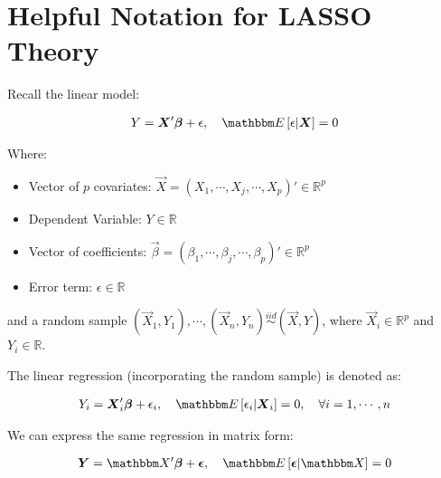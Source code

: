 \section{Helpful Notation for LASSO Theory}
\label{sec:notation-help-lasso}

Recall the linear model:

\begin{align*}
Y = \Vec{X}'\Vec{\beta} + \epsilon, 
    \quad \E{\epsilon|\Vec{X}} = 0
\end{align*}
 
Where:
\begin{itemize}
\item Vector of $p$ covariates: $\Vec{X} = (X_1, \cdots, X_j, \cdots , X_p)' \in \mathbb{R}^p$
\item Dependent Variable: $Y \in \mathbb{R}$
\item Vector of coefficients: $\Vec{\beta} = (\beta_1, \cdots, \beta_j, \cdots, \beta_p)' \in \mathbb{R}^p$
\item Error term: $\epsilon \in \mathbb{R}$
\end{itemize}

and a random sample $(\Vec{X}_1, Y_1), \cdots, (\Vec{X}_n, Y_n) \overset{iid}{\sim} (\Vec{X}, Y)$, where $\Vec{X}_i \in \mathbb{R}^p$ and $Y_i \in \mathbb{R}$.

The linear regression (incorporating the random sample) is denoted as:

\begin{align*}
Y_i = \Vec{X}_i'\Vec{\beta} + \epsilon_i, 
    \quad \E{\epsilon_i|\Vec{X}_i} = 0, \quad \forall i = 1, \cdots, n
\end{align*}

We can express the same regression in matrix form:

\begin{align*}
\Vec{Y} = \Mat{X}'\Vec{\beta} + \Vec{\epsilon}, 
    \quad \E{\Vec{\epsilon}|\Mat{X}} = 0
\end{align*}

